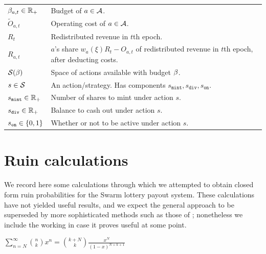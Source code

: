 \begin{tabularx}{\textwidth}{lX}
  $\beta_{a,t}\in\mathbb{R}_+$ & Budget of $a\in\mathcal{A}$. \\
  $\tilde O_{a,t}$ & Operating cost of $a\in\mathcal{A}$. \\
  $R_t$ & Redistributed revenue in $t$th epoch. \\
  $R_{a,t}$ & $a$'s share $w_a(\xi)R_t-O_{a,t}$ of redistributed revenue in $t$th epoch, after deducting costs. \\
  $\mathcal{S}(\beta)$ & Space of actions available with budget $\beta$. \\
  $s\in\mathcal{S}$ & An action/strategy. Has components $s_\mathtt{mint},s_\mathtt{div},s_\mathtt{on}$. \\
  $s_\mathtt{mint}\in\mathbb{R}_+$ & Number of shares to mint under action $s$. \\
  $s_\mathtt{div}\in\mathbb{R}_+$ & Balance to cash out under action $s$. \\
  $s_{\mathtt{on}}\in\{0,1\}$   & Whether or not to be active under action $s$.

\end{tabularx}




\section{Ruin calculations}
\label{section:ruin-calculations}

We record here some calculations through which we attempted to obtain closed form ruin probabilities for the Swarm lottery payout system.
%
These calculations have not yielded useful results, and we expect the general approach to be superseded by more sophisticated methods such as those of \cite{asmussen2010ruin,albrecher2022blockchain}; nonetheless we include the working in case it proves useful at some point.

\begin{lemma}

  $\sum_{n=N}^\infty { n\choose k } x^n = {k+N \choose k} \frac{x^N}{(1-x)^{N+k+1}}$

\end{lemma}

